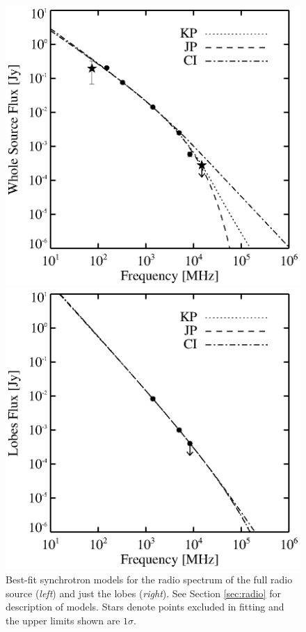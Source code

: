 \begin{figure}
  \begin{center}
    \begin{minipage}{0.495\linewidth}
      \includegraphics*[width=\textwidth, trim=27mm 5mm 35mm 10mm, clip]{radiofit.eps}
    \end{minipage}
    \begin{minipage}{0.495\linewidth}
      \includegraphics*[width=\textwidth, trim=27mm 5mm 35mm 10mm, clip]{radiofit_lobes.eps}
    \end{minipage}
    \caption{Best-fit synchrotron models for the radio spectrum of the
      full radio source ({\it{left}}) and just the lobes
      ({\it{right}}). See Section \ref{sec:radio} for description of
      models. Stars denote points excluded in fitting and the upper
      limits shown are $1\sigma$.}
    \label{fig:radio}
  \end{center}
\end{figure}

